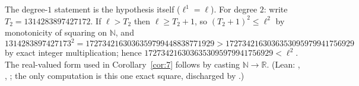 The degree-$1$ statement is the hypothesis itself ($\ell^1=\ell$). For degree $2$: write $T_2=1314283897427172$. If $\ell>T_2$ then $\ell\ge T_2+1$, so $(T_2+1)^2\le\ell^2$ by monotonicity of squaring on $\mathbb N$, and
\[ 1314283897427173^2=1727342163036359799448838771929>1727342163036353095979941756929 \]
by exact integer multiplication; hence $1727342163036353095979941756929<\ell^2$. The real-valued form used in Corollary~\ref{cor:7} follows by casting $\mathbb N\to\mathbb R$. (Lean: , , ; the only computation is this one exact square, discharged by .)
